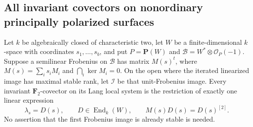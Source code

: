 \subsection{All invariant covectors on nonordinary principally polarized surfaces}
\label{subsec:nonordinary-ppav-covectors}

\begin{lemma}
\label{lem:linear-covectors-any-nil-length}
Let $k$ be algebraically closed of characteristic two, let $W$ be a
finite-dimensional $k$-space with coordinates $s_1,\ldots,s_b$, and put
$P=\mathbf P(W)$ and $\mathcal B=W^*\otimes\mathcal O_P(-1)$.
Suppose a semilinear Frobenius on $\mathcal B$ has matrix
$M(s)^t$, where $M(s)=\sum_i s_iM_i$ and
$\bigcap_i\ker M_i=0$. On the open where the iterated linearized image
has maximal stable rank, let $\mathcal I$ be that unit-Frobenius image.
Every invariant $\mathbf F_2$-covector on its Lang local system is the
restriction of exactly one linear expression
\[
             \lambda_s=D(s),\qquad D\in\operatorname{End}_k(W),
             \qquad M(s)D(s)=D(s)^{[2]}.
\]
No assertion that the first Frobenius image is already stable is needed.
\end{lemma}
